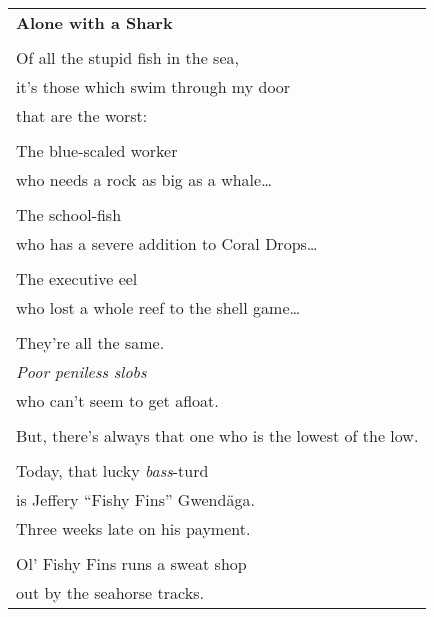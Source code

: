 \documentclass{article}
\begin{document}
\newcommand{\h}{\hspace*{2ex}}
\begin{center}
\begin{tabular}{l}
\textbf{Alone with a Shark} \\
\\
Of all the stupid fish in the sea, \\
\h{}it's those which swim through my door \\
that are the worst: \\
\\
\h{}The blue-scaled worker \\
\h\h{}who needs a rock as big as a whale\ldots \\
\\
\h{}The school-fish \\
\h\h{}who has a severe addition to Coral Drops\ldots \\
\\
\h{}The executive eel \\
\h\h{}who lost a whole reef to the shell game\ldots \\
\\
They're all the same. \\
\h{}\textit{Poor peniless slobs} \\
who can't seem to get afloat. \\
\\
But, there's always that one who is the lowest of the low. \\
\\                                          %
Today, that lucky \textit{bass}-turd \\
\h{}is Jeffery ``Fishy Fins'' Gwend{\"a}ga. \\
Three weeks late on his payment. \\
\\
Ol' Fishy Fins runs a sweat shop \\ %
out by the seahorse tracks. \\


\end{tabular}
\end{center}
\end{document}
